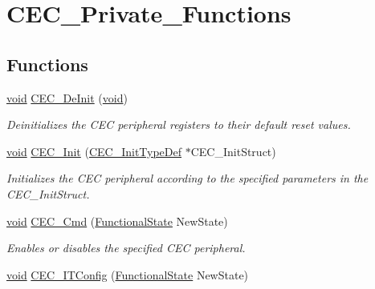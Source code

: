 \hypertarget{group___c_e_c___private___functions}{}\section{C\+E\+C\+\_\+\+Private\+\_\+\+Functions}
\label{group___c_e_c___private___functions}
\subsection*{Functions}
\begin{DoxyCompactItemize}
\item 
\hyperlink{usb__devapi_8h_afabf60e7f57651d6d595a02c75f07cd0}{void} \hyperlink{group___c_e_c___private___functions_ga604c3b15b51a46303c201fa3deac2212}{C\+E\+C\+\_\+\+De\+Init} (\hyperlink{usb__devapi_8h_afabf60e7f57651d6d595a02c75f07cd0}{void})
\begin{DoxyCompactList}\small\item\em Deinitializes the C\+EC peripheral registers to their default reset values. \end{DoxyCompactList}\item 
\hyperlink{usb__devapi_8h_afabf60e7f57651d6d595a02c75f07cd0}{void} \hyperlink{group___c_e_c___private___functions_gaf48aee745a16370372b3eaa7cf3ed22b}{C\+E\+C\+\_\+\+Init} (\hyperlink{struct_c_e_c___init_type_def}{C\+E\+C\+\_\+\+Init\+Type\+Def} $\ast$C\+E\+C\+\_\+\+Init\+Struct)
\begin{DoxyCompactList}\small\item\em Initializes the C\+EC peripheral according to the specified parameters in the C\+E\+C\+\_\+\+Init\+Struct. \end{DoxyCompactList}\item 
\hyperlink{usb__devapi_8h_afabf60e7f57651d6d595a02c75f07cd0}{void} \hyperlink{group___c_e_c___private___functions_ga0c8efa79e5768930e567b3b3ed6e09e9}{C\+E\+C\+\_\+\+Cmd} (\hyperlink{agilefox_2library_2inc_2stm32f10x__type_8h_ac9a7e9a35d2513ec15c3b537aaa4fba1}{Functional\+State} New\+State)
\begin{DoxyCompactList}\small\item\em Enables or disables the specified C\+EC peripheral. \end{DoxyCompactList}\item 
\hyperlink{usb__devapi_8h_afabf60e7f57651d6d595a02c75f07cd0}{void} \hyperlink{group___c_e_c___private___functions_ga8be87c514505cf82eb29334f054fc0bc}{C\+E\+C\+\_\+\+I\+T\+Config} (\hyperlink{agilefox_2library_2inc_2stm32f10x__type_8h_ac9a7e9a35d2513ec15c3b537aaa4fba1}{Functional\+State} New\+State)

\end{DoxyCompactItemize}
